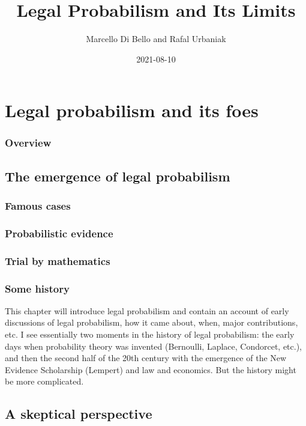 \documentclass[]{book}
\title{Legal Probabilism and Its Limits}
\author{Marcello Di Bello and Rafal Urbaniak}
\date{2021-08-10}
\begin{document}
\maketitle

{
\setcounter{tocdepth}{1}
\tableofcontents
}
\part{Legal probabilism and its foes}

\section*{Overview}

\chapter{The emergence of legal probabilism}

\section{Famous cases}

\section{Probabilistic evidence}

\section{Trial by mathematics}

\section{Some history}

This chapter will introduce legal probabilism and contain an account of
early\\
discussions of legal probabilism, how it came about, when, major
contributions, etc. I see essentially two moments in the history of
legal probabilism: the early days when probability theory was invented
(Bernoulli, Laplace, Condorcet, etc.), and then the second half of the
20th century with the emergence of the New Evidence Scholarship
(Lempert) and law and economics. But the history might be more
complicated.

\chapter{A skeptical perspective}
\end{document}
